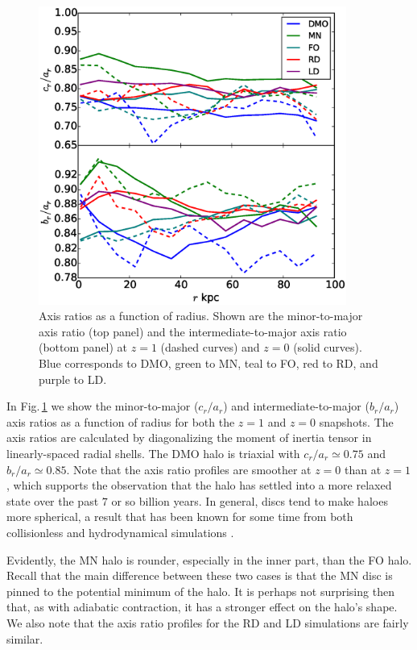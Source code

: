 \begin{figure} 
\centering 
\includegraphics[width=0.9\textwidth]{../figures/eigenratios_vs_radius.eps} 
\caption{Axis ratios as a function of radius.  Shown are the
  minor-to-major axis ratio (top panel) and the intermediate-to-major
  axis ratio (bottom panel) at $z=1$ (dashed curves) and $z=0$ (solid
  curves).  Blue corresponds to DMO, green to MN, teal to FO, red to RD, and
  purple to LD.}
\label{fig:axis_ratios}
\end{figure}

In Fig.\,\ref{fig:axis_ratios} we show the minor-to-major ($c_r/a_r$)
and intermediate-to-major ($b_r/a_r$) axis ratios as a function of
radius for both the $z=1$ and $z=0$ snapshots.  The axis ratios are
calculated by diagonalizing the moment of inertia tensor in
linearly-spaced radial shells.  The DMO halo is triaxial with
$c_r/a_r\simeq 0.75$ and $b_r/a_r\simeq 0.85$.  Note that the axis
ratio profiles are smoother at $z=0$ than at $z=1$, which supports the
observation that the halo has settled into a more relaxed state over
the past $7$ or so billion years.  In general, discs tend to make
haloes more spherical, a result that has been known for some time from
both collisionless and hydrodynamical simulations
\citep[e.g.][]{dubinski1994_ApJ431_617,Zemp2012}.


Evidently, the MN halo is rounder, especially in the inner part, than
the FO halo.  Recall that the main difference between these two cases
is that the MN disc is pinned to the potential minimum of the halo.
It is perhaps not surprising then that, as with adiabatic contraction,
it has a stronger effect on the halo's shape.  
We also note that the axis ratio profiles for the RD and LD simulations
are fairly similar.  

